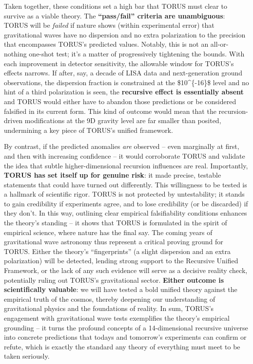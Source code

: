 \documentclass[
]{article}
\begin{document}
Taken together, these conditions set a high bar that TORUS must clear to
survive as a viable theory. The \textbf{``pass/fail'' criteria are
unambiguous}: TORUS will be \emph{failed} if nature shows (within
experimental error) that gravitational waves have no dispersion and no
extra polarization to the precision that encompasses TORUS's predicted
values\hspace{0pt}. Notably, this is not an all-or-nothing one-shot
test; it's a matter of progressively tightening the bounds. With each
improvement in detector sensitivity, the allowable window for TORUS's
effects narrows. If after, say, a decade of LISA data and
next-generation ground observations, the dispersion fraction is
constrained at the \$10\^{}\{-16\}\$ level and no hint of a third
polarization is seen, the \textbf{recursive effect is essentially
absent} and TORUS would either have to abandon those predictions or be
considered falsified in its current form\hspace{0pt}. This kind of
outcome would mean that the recursion-driven modifications at the 9D
gravity level are far smaller than posited, undermining a key piece of
TORUS's unified framework\hspace{0pt}.

By contrast, if the predicted anomalies \emph{are} observed -- even
marginally at first, and then with increasing confidence -- it would
corroborate TORUS and validate the idea that subtle higher-dimensional
recursion influences are real. Importantly, \textbf{TORUS has set itself
up for genuine risk}: it made precise, testable statements that could
have turned out differently. This willingness to be tested is a hallmark
of scientific rigor. TORUS is not protected by untestability; it stands
to gain credibility if experiments agree, and to lose credibility (or be
discarded) if they don't\hspace{0pt}. In this way, outlining clear
empirical falsifiability conditions enhances the theory's standing -- it
shows that TORUS is formulated in the spirit of empirical science, where
nature has the final say. The coming years of gravitational wave
astronomy thus represent a critical proving ground for TORUS. Either the
theory's ``fingerprints'' (a slight dispersion and an extra
polarization) will be detected, lending strong support to the Recursive
Unified Framework, or the lack of any such evidence will serve as a
decisive reality check, potentially ruling out TORUS's gravitational
sector. \textbf{Either outcome is scientifically valuable}: we will have
tested a bold unified theory against the empirical truth of the cosmos,
thereby deepening our understanding of gravitational physics and the
foundations of reality. In sum, TORUS's engagement with gravitational
wave tests exemplifies the theory's empirical grounding -- it turns the
profound concepts of a 14-dimensional recursive universe into concrete
predictions that today\textquotesingle s and tomorrow's experiments can
confirm or refute, which is exactly the standard any theory of
everything must meet to be taken seriously.\hspace{0pt}
\end{document}
